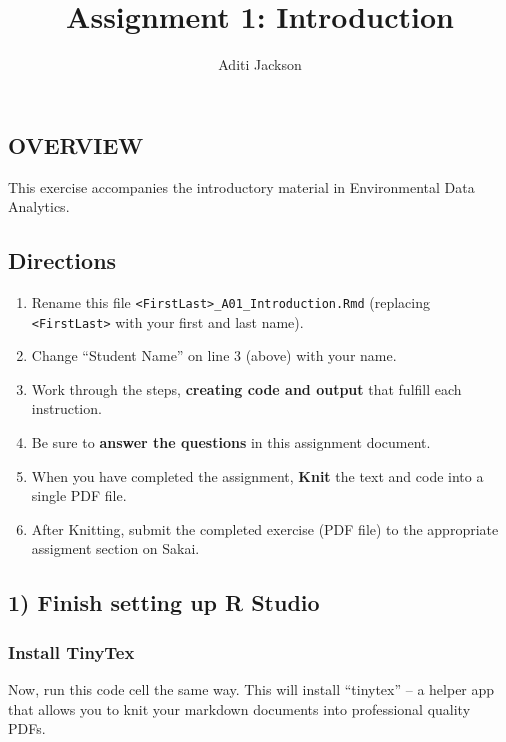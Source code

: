 \documentclass[
]{article}
\title{Assignment 1: Introduction}
\author{Aditi Jackson}
\date{}
\providecommand{\tightlist}{%
  \setlength{\itemsep}{0pt}\setlength{\parskip}{0pt}}
\begin{document}
\maketitle

\hypertarget{overview}{%
\subsection{OVERVIEW}\label{overview}}

This exercise accompanies the introductory material in Environmental
Data Analytics.

\hypertarget{directions}{%
\subsection{Directions}\label{directions}}

\begin{enumerate}
\def\labelenumi{\arabic{enumi}.}
\tightlist
\item
  Rename this file
  \texttt{\textless{}FirstLast\textgreater{}\_A01\_Introduction.Rmd}
  (replacing \texttt{\textless{}FirstLast\textgreater{}} with your first
  and last name).
\item
  Change ``Student Name'' on line 3 (above) with your name.
\item
  Work through the steps, \textbf{creating code and output} that fulfill
  each instruction.
\item
  Be sure to \textbf{answer the questions} in this assignment document.
\item
  When you have completed the assignment, \textbf{Knit} the text and
  code into a single PDF file.
\item
  After Knitting, submit the completed exercise (PDF file) to the
  appropriate assigment section on Sakai.
\end{enumerate}

\hypertarget{finish-setting-up-r-studio}{%
\subsection{1) Finish setting up R
Studio}\label{finish-setting-up-r-studio}}

\hypertarget{install-tinytex}{%
\subsubsection{Install TinyTex}\label{install-tinytex}}

Now, run this code cell the same way. This will install ``tinytex'' -- a
helper app that allows you to knit your markdown documents into
professional quality PDFs.
\end{document}
